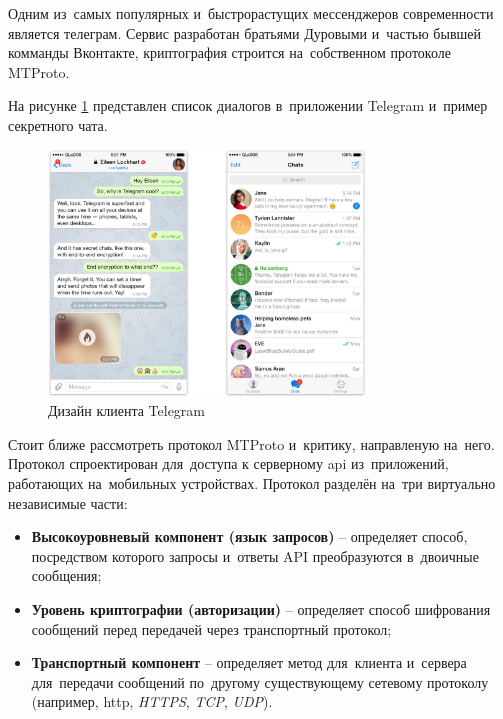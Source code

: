 \subsubsection{}
\label{sec:analysis:research:analogs:telegram}

Одним из~самых популярных и~быстрорастущих мессенджеров современности является телеграм. 
Сервис разработан братьями Дуровыми и~частью бывшей комманды Вконтакте, криптография строится на~собственном протоколе MTProto.

На рисунке \ref{sec:analysis:research:analogs:telegram:ui} представлен список диалогов в~приложении Telegram и~пример секретного чата.

\begin{figure}[h]
  \centering
    \includegraphics[width=0.75\textwidth]{inc/img/tg_combined.jpg}
  \caption{Дизайн клиента Telegram}
  \label{sec:analysis:research:analogs:telegram:ui}
\end{figure}

Стоит ближе рассмотреть протокол MTProto и~критику, направленую на~него. Протокол спроектирован для~доступа к серверному \gls{api} из~приложений, работающих на~мобильных устройствах. 
Протокол разделён на~три виртуально независимые части: 
\begin{itemize}
	\item \textbf{Высокоуровневый компонент (язык запросов)} -- определяет способ, посредством которого запросы и~ответы API преобразуются в~двоичные сообщения;
	\item \textbf{Уровень криптографии (авторизации)} -- определяет способ шифрования сообщений перед передачей через транспортный протокол;
	\item \textbf{Транспортный компонент} -- определяет метод для~клиента и~сервера для~передачи сообщений по~другому существующему сетевому протоколу (например, \gls{http}, \textit{HTTPS}, \textit{TCP}, \textit{UDP}).
\end{itemize}

